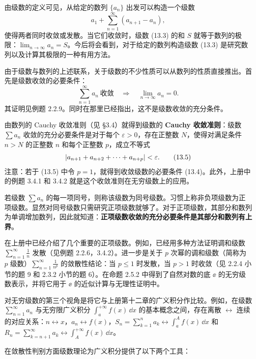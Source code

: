 由级数的定义可见，从给定的数列 $\{a_n\}$ 出发可以构造一个级数
\begin{equation}
a_1+\sum_{n=1}^{\infty}(a_{n+1}-a_n),
\tag{13.3}
\end{equation}
使得两者同时收敛或发散。当它们收敛时，级数 (13.3) 的和 $S$ 就等于数列的极限：$\lim_{n\to\infty}a_n=S$。今后将会看到，对于给定的数列构造级数 (13.3) 是研究数列以及计算其极限的一种有用方法。

由于级数与数列的上述联系，关于级数的不少性质可以从数列的性质直接推出。首先是级数收敛的必要条件：
\begin{equation}
\sum_{n=1}^{\infty}a_n\ \text{收敛}\quad\Longrightarrow\quad \lim_{n\to\infty}a_n=0.
\tag{13.4}
\end{equation}
其证明见例题 2.2.9。同时在那里已经指出，这不是级数收敛的充分条件。

由数列的 Cauchy 收敛准则（见 §3.4）就得到级数的 \textbf{Cauchy 收敛准则}：级数 $\sum a_n$ 收敛的充分必要条件是对于每个 $\varepsilon>0$，存在正整数 $N$，使得对满足条件 $n>N$ 的正整数 $n$ 和每个正整数 $p$，成立不等式
\begin{equation}
\lvert a_{n+1}+a_{n+2}+\cdots+a_{n+p}\rvert<\varepsilon.
\tag{13.5}
\end{equation}
注意：若于 (13.5) 中令 $p=1$，就得到收敛级数的必要条件 (13.4)。此外，上册中的例题 3.4.1 和 3.4.2 就是这个收敛准则在无穷级数上的应用。

若级数 $\sum a_n$ 的每一项同号，则称该级数为同号级数。习惯上称非负项级数为正项级数。显然对同号级数只需研究正项级数就够了。对于正项级数，其部分和数列为单调增加数列，因此就知道：\textbf{正项级数收敛的充分必要条件是其部分和数列有上界}。

在上册中已经介绍了几个重要的正项级数。例如，已经用多种方法证明调和级数 $\sum_{n=1}^{\infty}\frac1n$ 发散（见例题 2.2.6，3.4.2）。进一步是关于 $p$ 次幂的调和级数（简称为 $p$ 级数）$\sum_{n=1}^{\infty}\frac1{n^p}$ 的敛散性结论：当 $p\leq1$ 时发散，当 $p>1$ 时收敛（见 2.2.4 小节的题 9 和 2.3.2 小节的题 6）。在命题 2.5.2 中得到了自然对数的底 $\ee$ 的无穷级数表示，并将它用于 $\ee$ 的近似计算与无理性证明中。

对无穷级数的第三个视角是将它与上册第十二章的广义积分作比较。例如，在级数 $\sum_{n=1}^{\infty}a_n$ 与无穷限广义积分 $\int_a^{+\infty}f(x)\,\dd x$ 的基本概念之间，存在离散 $\leftrightarrow$ 连续的对应关系：$n\leftrightarrow x$，$a_n\leftrightarrow f(x)$，$S_n=\sum_{k=1}^{n}a_k\leftrightarrow\int_a^A f(x)\,\dd x$ 和 $R_n=\sum_{k=n+1}^{\infty}a_k\leftrightarrow\int_A^{+\infty}f(x)\,\dd x$。

在敛散性判别方面级数理论为广义积分提供了以下两个工具：

